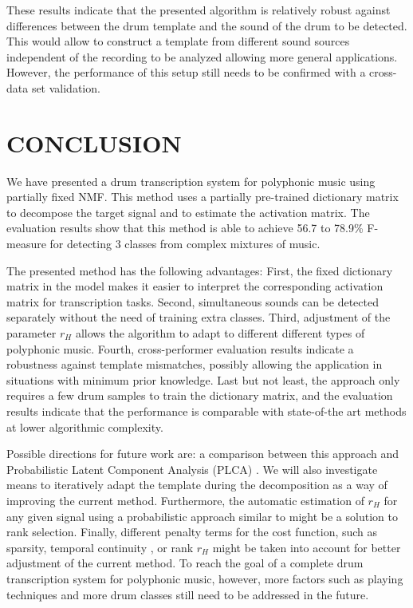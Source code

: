 \documentclass{article}
\begin{document}
These results indicate that the presented algorithm is relatively robust against differences between the drum template and the sound of the drum to be detected. This would allow to construct a template from different sound sources independent of the recording to be analyzed allowing more general applications. However, the performance of this setup still needs to be confirmed with a cross-data set validation.

\section{CONCLUSION}\label{sec:Conclusion}

We have presented a drum transcription system for polyphonic music using partially fixed NMF. This method uses a partially pre-trained dictionary matrix to decompose the target signal and to estimate the activation matrix. The evaluation results show that this method is able to achieve 56.7 to 78.9\% F-measure for detecting 3 classes from complex mixtures of music. 

The presented method has the following advantages: 
First, the fixed dictionary matrix in the model makes it easier to interpret the corresponding activation matrix for transcription tasks.
Second, simultaneous sounds can be detected separately without the need of training extra classes.  
Third, adjustment of the parameter $r_H$ allows the algorithm to adapt to different different types of polyphonic music. 
Fourth, cross-performer evaluation results indicate a robustness against template mismatches, possibly allowing the application in situations with minimum prior knowledge. 
Last but not least, the approach only requires a few drum samples to train the dictionary matrix, and the evaluation results indicate that the performance is comparable with state-of-the art methods at lower algorithmic complexity. 

Possible directions for future work are: 
a comparison between this approach and Probabilistic Latent Component Analysis (PLCA) \cite{smaragdis_plca_2014}. We will also investigate means to iteratively adapt the template during the decomposition as a way of improving the current method. %
Furthermore, the automatic estimation of $r_H$ for any given signal using a probabilistic approach similar to  \cite{ouo_inmf_2010} might be a solution to rank selection. Finally, different penalty terms for the cost function, such as sparsity, temporal continuity \cite{Virtanen_ssnmf_2007}, or rank $r_H$ might be taken into account for better adjustment of the current method. To reach the goal of a complete drum transcription system for polyphonic music, however, more factors such as playing techniques and more drum classes still need to be addressed in the future. 
\end{document}
